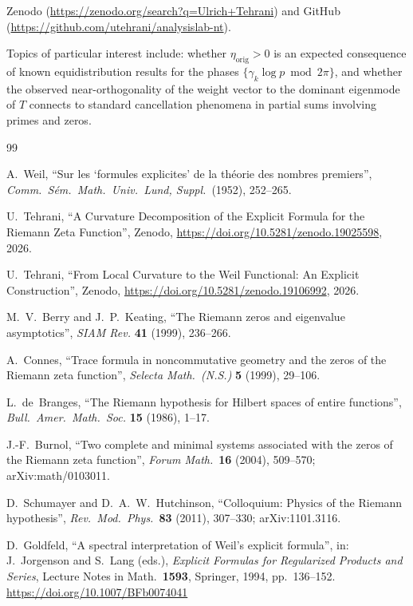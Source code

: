 \documentclass[11pt]{article}
\newcommand{\etaorig}{\eta_{\mathrm{orig}}}
\begin{document}
{\sloppy
Zenodo (\url{https://zenodo.org/search?q=Ulrich+Tehrani}) and GitHub
(\url{https://github.com/utehrani/analysislab-nt}).
\par}

Topics of particular interest include: whether $\etaorig>0$ is an
expected consequence of known equidistribution results for the phases
$\{\gamma_k\log p \bmod 2\pi\}$, and whether the observed
near-orthogonality of the weight vector to the dominant eigenmode of
$T$ connects to standard cancellation phenomena in partial sums
involving primes and zeros.


\newpage
\begin{thebibliography}{99}

A.~Weil,
``Sur les `formules explicites' de la th\'eorie des nombres premiers'',
\emph{Comm.\ S\'em.\ Math.\ Univ.\ Lund, Suppl.}\ (1952), 252--265.

U.~Tehrani,
``A Curvature Decomposition of the Explicit Formula
  for the Riemann Zeta Function'',
Zenodo, \url{https://doi.org/10.5281/zenodo.19025598}, 2026.

U.~Tehrani,
``From Local Curvature to the Weil Functional:
  An Explicit Construction'',
Zenodo, \url{https://doi.org/10.5281/zenodo.19106992}, 2026.

M.~V.~Berry and J.~P.~Keating,
``The Riemann zeros and eigenvalue asymptotics'',
\emph{SIAM Rev.} \textbf{41} (1999), 236--266.

A.~Connes,
``Trace formula in noncommutative geometry and the zeros of the Riemann
zeta function'',
\emph{Selecta Math.\ (N.S.)} \textbf{5} (1999), 29--106.

L.~de~Branges,
``The Riemann hypothesis for Hilbert spaces of entire functions'',
\emph{Bull.\ Amer.\ Math.\ Soc.} \textbf{15} (1986), 1--17.

J.-F.~Burnol,
``Two complete and minimal systems associated with the zeros of the
Riemann zeta function'',
\textit{Forum Math.}\ \textbf{16} (2004), 509--570;
arXiv:math/0103011.

D.~Schumayer and D.~A.~W.~Hutchinson,
``Colloquium: Physics of the Riemann hypothesis'',
\textit{Rev.\ Mod.\ Phys.}\ \textbf{83} (2011), 307--330;
arXiv:1101.3116.

D.~Goldfeld,
``A spectral interpretation of Weil's explicit formula'',
in: J.~Jorgenson and S.~Lang (eds.),
\emph{Explicit Formulas for Regularized Products and Series},
Lecture Notes in Math.\ \textbf{1593}, Springer, 1994, pp.~136--152.
\url{https://doi.org/10.1007/BFb0074041}


\end{thebibliography}
\end{document}
